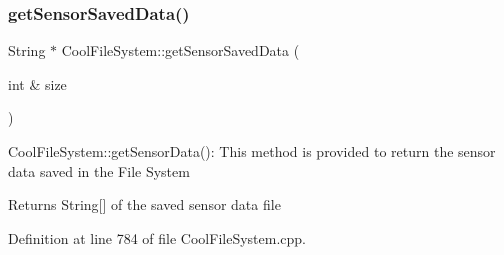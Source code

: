 \subsubsection{\texorpdfstring{get\+Sensor\+Saved\+Data()}{getSensorSavedData()}}
{\footnotesize\ttfamily String $\ast$ Cool\+File\+System\+::get\+Sensor\+Saved\+Data (\begin{DoxyParamCaption}\item[{int \&}]{size }\end{DoxyParamCaption})}

Cool\+File\+System\+::get\+Sensor\+Data()\+: This method is provided to return the sensor data saved in the File System

\begin{DoxyReturn}{Returns}
String\mbox{[}\mbox{]} of the saved sensor data file 
\end{DoxyReturn}


Definition at line 784 of file Cool\+File\+System.\+cpp.


